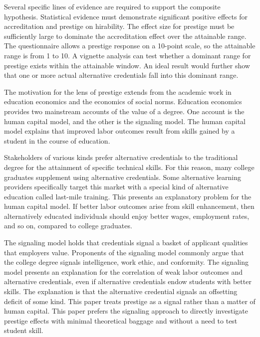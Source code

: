 \documentclass[review]{elsarticle}
\begin{document}
Several specific lines of evidence are required to support the composite hypothesis.
Statistical evidence must demonstrate significant positive effects for accreditation and prestige on hirability.
The effect size for prestige must be sufficiently large to dominate the accreditation effect over the attainable range.
The questionnaire allows a prestige response on a 10-point scale, so the attainable range is from 1 to 10.
A vignette analysis can test whether a dominant range for prestige exists within the attainable window.
An ideal result would further show that one or more actual alternative credentials fall into this dominant range.

The motivation for the lens of prestige extends from the academic work in education economics and the economics of social norms.
Education economics provides two mainstream accounts of the value of a degree.
One account is the human capital model, and the other is the signaling model.
The human capital model explains that improved labor outcomes result from skills gained by a student in the course of education.

Stakeholders of various kinds prefer alternative credentials to the traditional degree for the attainment of specific technical skills\cite{craig2018new}.
For this reason, many college graduates supplement using alternative credentials.
Some alternative learning providers specifically target this market with a special kind of alternative education called last-mile training.
This presents an explanatory problem for the human capital model.
If better labor outcomes arise from skill enhancement,
then alternatively educated individuals should enjoy better wages, employment rates, and so on,
compared to college graduates.

The signaling model holds that credentials signal a basket of applicant qualities that employers value.
Proponents of the signaling model commonly argue that the college degree signals intelligence,
work ethic, and conformity\cite{caplan_2012}.
The signaling model presents an explanation for
the correlation of weak labor outcomes and alternative credentials,
even if alternative credentials endow students with better skills.
The explanation is that the alternative credential signals
an offsetting deficit of some kind.
This paper treats prestige as a signal rather than a matter of human capital.
This paper prefers the signaling approach to directly investigate prestige effects
with minimal theoretical baggage and without a need to test student skill.
\end{document}
